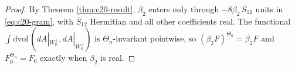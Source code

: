 \begin{proof}
By Theorem \ref{thm:c20-result}, $\beta_2$ enters only through $-8\beta_2\,\overline S_{12}$ units in \eqref{eq:c20-gram}, with $\overline S_{12}$ Hermitian and all other coefficients real. The functional $\int\mathrm{dvol}\,(dA|_{W_{\mathbb R}^\perp},dA|_{W_{\mathbb R}^\perp})$ is $\Theta_n$-invariant pointwise, so $(\beta_2F)^{\Theta_n}=\overline{\beta_2}F$ and $F_0^{\Theta_n}=F_0$ exactly when $\beta_2$ is real.
\end{proof}
